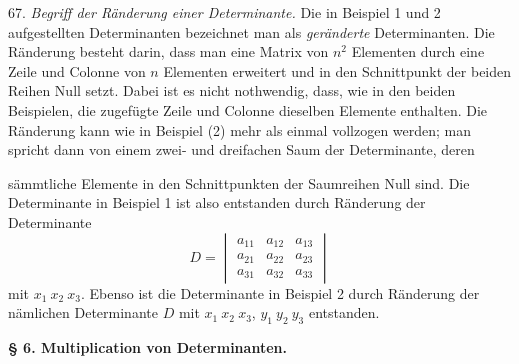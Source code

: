 67. \textit{Begriff der R\"anderung einer Determinante.} Die in Beispiel 1 und 2 aufgestellten Determinanten bezeichnet man als \textit{geränderte} Determinanten. Die Ränderung besteht darin, dass man eine Matrix von $n^2$ Elementen durch eine Zeile und Colonne von $n$ Elementen erweitert und in den Schnittpunkt der beiden Reihen Null setzt. Dabei ist es nicht nothwendig, dass, wie in den beiden Beispielen, die zugefügte Zeile und Colonne dieselben Elemente enthalten. Die Ränderung kann wie in Beispiel (2) mehr als einmal vollzogen werden; man spricht dann von einem zwei- und dreifachen Saum der Determinante, deren


sämmtliche Elemente in den Schnittpunkten der Saumreihen Null sind.
Die Determinante in Beispiel 1 ist also entstanden durch Ränderung
der Determinante
\[
D = \begin{vmatrix} a_{11} & a_{12} & a_{13} \\ a_{21} & a_{22} & a_{23} \\ a_{31} & a_{32} & a_{33} \end{vmatrix}
\]
mit $x_1\ x_2\ x_3$. Ebenso ist die Determinante in Beispiel 2 durch
Ränderung der nämlichen Determinante $D$ mit $x_1\ x_2\ x_3$, $y_1\ y_2\ y_3$
entstanden.

\begin{center}
\textbf{§ 6. Multiplication von Determinanten.}
\end{center}

